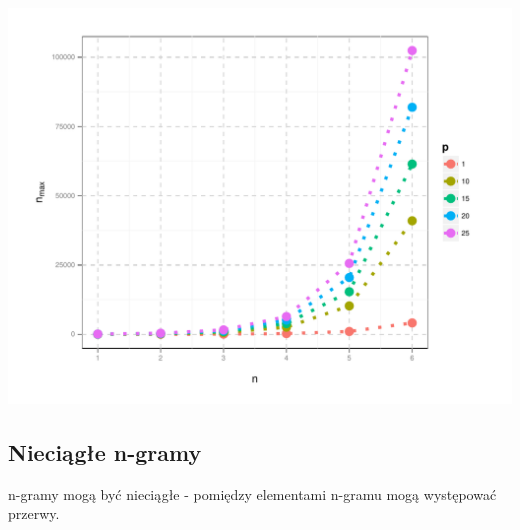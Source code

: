 \documentclass[10pt]{beamer}\usepackage[]{graphicx}\usepackage[]{color}
\makeatletter
\def\maxwidth{ %
  \ifdim\Gin@nat@width>\linewidth
    \linewidth
  \else
    \Gin@nat@width
  \fi
}
\makeatother
\begin{document}
\begin{frame}


\includegraphics[width=\maxwidth]{figure/unnamed-chunk-8-1} 

\end{frame}

\subsection{Nieciągłe n-gramy}

\begin{frame}

n-gramy mogą być nieciągłe - pomiędzy elementami n-gramu mogą występować przerwy.

\end{frame}
\end{document}
